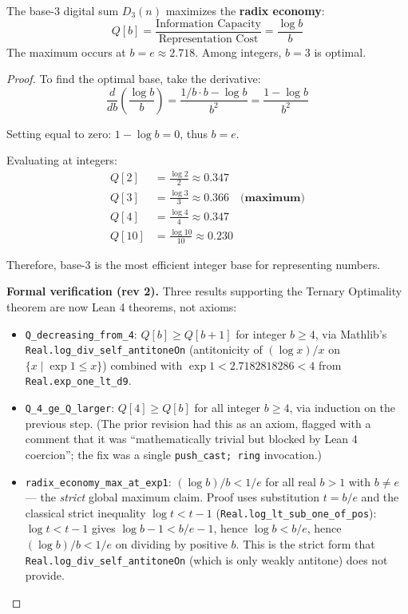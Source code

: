\begin{thm}\label{thm:base-3-optimal}
The base-3 digital sum $D_3(n)$ maximizes the \textbf{radix economy}:
\begin{equation}
Q[b] = \frac{\text{Information Capacity}}{\text{Representation Cost}} = \frac{\log b}{b}
\end{equation}
The maximum occurs at $b = e \approx 2.718$. Among integers, $b = 3$ is optimal.
\end{thm}

\begin{proof}
To find the optimal base, take the derivative:
\begin{equation}
\frac{d}{db}\left(\frac{\log b}{b}\right) = \frac{1/b \cdot b - \log b}{b^2} = \frac{1 - \log b}{b^2}
\end{equation}

Setting equal to zero: $1 - \log b = 0$, thus $b = e$.

Evaluating at integers:
\begin{align}
Q[2] &= \frac{\log 2}{2} \approx 0.347 \\
Q[3] &= \frac{\log 3}{3} \approx 0.366 \quad \textbf{(maximum)} \\
Q[4] &= \frac{\log 4}{4} \approx 0.347 \\
Q[10] &= \frac{\log 10}{10} \approx 0.230
\end{align}

Therefore, base-3 is the most efficient integer base for representing numbers.

\textbf{Formal verification (rev 2).} Three results supporting the Ternary Optimality theorem are now Lean 4 theorems, not axioms:
\begin{itemize}
\item \texttt{Q\_decreasing\_from\_4}: $Q[b] \geq Q[b+1]$ for integer $b \geq 4$, via Mathlib's \texttt{Real.log\_div\_self\_antitoneOn} (antitonicity of $(\log x)/x$ on $\{x \mid \exp 1 \leq x\}$) combined with $\exp 1 < 2.7182818286 < 4$ from \texttt{Real.exp\_one\_lt\_d9}.
\item \texttt{Q\_4\_ge\_Q\_larger}: $Q[4] \geq Q[b]$ for all integer $b \geq 4$, via induction on the previous step. (The prior revision had this as an axiom, flagged with a comment that it was ``mathematically trivial but blocked by Lean 4 coercion''; the fix was a single \texttt{push\_cast; ring} invocation.)
\item \texttt{radix\_economy\_max\_at\_exp1}: $(\log b)/b < 1/e$ for all real $b > 1$ with $b \neq e$ --- the \emph{strict} global maximum claim. Proof uses substitution $t = b/e$ and the classical strict inequality $\log t < t - 1$ (\texttt{Real.log\_lt\_sub\_one\_of\_pos}): $\log t < t - 1$ gives $\log b - 1 < b/e - 1$, hence $\log b < b/e$, hence $(\log b)/b < 1/e$ on dividing by positive $b$. This is the strict form that \texttt{Real.log\_div\_self\_antitoneOn} (which is only weakly antitone) does not provide.
\end{itemize}
\end{proof}

